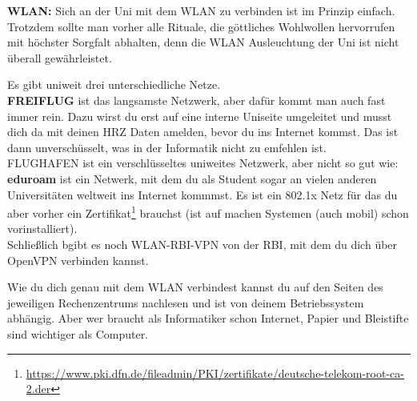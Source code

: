 \textbf{WLAN:}
Sich an der Uni mit dem WLAN zu verbinden ist im Prinzip einfach.
Trotzdem sollte man vorher alle Rituale, die g\"ottliches Wohlwollen hervorrufen mit h\"ochster Sorgfalt abhalten,
denn die WLAN Ausleuchtung der Uni ist nicht \"uberall gew\"ahrleistet.

Es gibt uniweit drei unterschiedliche Netze.\\
\textbf{FREIFLUG} ist das langsamste Netzwerk, aber daf\"ur kommt man auch fast immer rein. Dazu wirst du erst auf eine interne Uniseite umgeleitet und musst dich da mit deinen HRZ Daten amelden, bevor du ins Internet kommst. Das ist dann unversch\"usselt, was in der Informatik nicht zu emfehlen ist.\\
FLUGHAFEN ist ein verschl\"usseltes uniweites Netzwerk, aber nicht so gut wie:\\
\textbf{eduroam} ist ein Netwerk, mit dem du als Student sogar an vielen anderen Universit\"aten weltweit ins Internet kommmst.
Es ist ein 802.1x Netz f\"ur das du aber vorher ein Zertifikat\footnote{\url{https://www.pki.dfn.de/fileadmin/PKI/zertifikate/deutsche-telekom-root-ca-2.der}} brauchst (ist auf machen Systemen (auch mobil) schon vorinstalliert).\\
Schlie{\ss}lich bgibt es noch WLAN-RBI-VPN von der RBI, mit dem du dich \"uber OpenVPN verbinden kannst.

Wie du dich genau mit dem WLAN verbindest kannst du auf den Seiten des jeweiligen Rechenzentrums nachlesen und ist von deinem Betriebssystem abh\"angig. Aber wer braucht als Informatiker schon Internet, Papier und Bleistifte sind wichtiger als Computer.






\spaltenende
